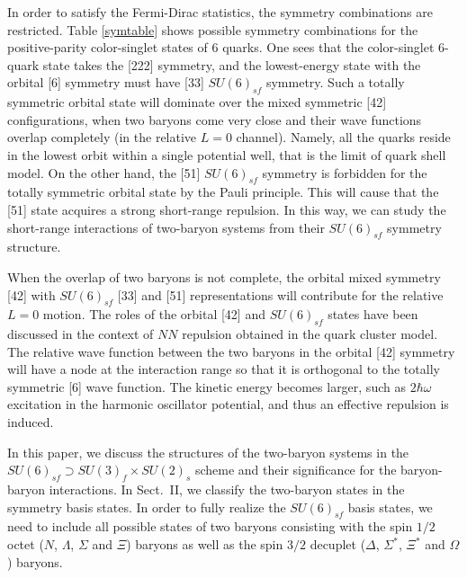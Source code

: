 \documentclass[aps,prd,showpacs,floatfix,reprint,nofootinbib]{revtex4-1}
\begin{document}
In order to satisfy the Fermi-Dirac statistics, the symmetry combinations are restricted.
Table \ref{symtable} shows possible symmetry combinations for the positive-parity color-singlet states of 6 quarks.
One sees that the color-singlet 6-quark state takes the [222] symmetry, and
the lowest-energy state with the orbital [6] symmetry must have [33] $SU(6)_{sf}$ symmetry.
Such a totally symmetric orbital state will dominate over the mixed symmetric [42] configurations, 
when two baryons come very close
and their wave functions overlap completely (in the relative $L=0$ channel).
Namely, all the quarks reside in the lowest orbit within a single potential well, that is the limit of 
quark shell model\cite{Arima}.
On the other hand, the [51] $SU(6)_{sf}$ symmetry is forbidden for the totally symmetric 
orbital state by the Pauli principle.
This will cause that the [51] state acquires a strong short-range repulsion.
In this way, we can study the short-range interactions of two-baryon systems 
from their $SU(6)_{sf}$ symmetry structure.

When the overlap of two baryons is not complete, 
the orbital mixed symmetry [42] with $SU(6)_{sf}$ [33] and [51] representations will contribute for the relative $L=0$ motion.
The roles of the orbital [42] and $SU(6)_{sf}$ states have been discussed in the context of $NN$ repulsion 
obtained in the quark cluster model\cite{Harvey,Faessler, Arima}.
The relative wave function between the two baryons in the orbital [42] symmetry 
will have a node at the interaction range so that 
it is orthogonal to the totally symmetric [6] wave function.
The kinetic energy becomes larger, such as $2\hbar \omega$ excitation in the harmonic oscillator potential,
and thus an effective repulsion is induced.

In this paper, we discuss the structures of the two-baryon systems in the $SU(6)_{sf}\supset SU(3)_f\times SU(2)_s$
scheme and their significance for the baryon-baryon interactions. 
In Sect.~II, we classify the two-baryon states in the symmetry basis states. 
In order to fully realize the $SU(6)_{sf}$ basis states, we need to include all possible states of two baryons 
consisting with the spin $1/2$ octet ($N$, $\Lambda$, $\Sigma$ and $\Xi$) baryons 
as well as the spin $3/2$ decuplet ($\Delta$, $\Sigma^*$, $\Xi^*$ and $\Omega$) baryons.
\end{document}
